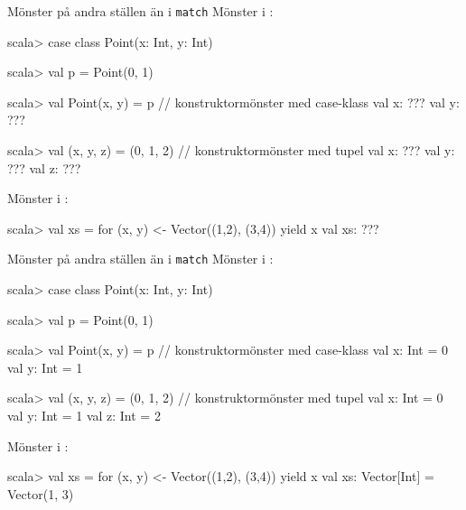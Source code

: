 \ifkompendium\else
\begin{Slide}{Mönster på andra ställen än i \texttt{match}}\SlideFontSmall
Mönster i :
\vspace{-0.25em}\begin{REPL}
scala> case class Point(x: Int, y: Int)

scala> val p = Point(0, 1)

scala> val Point(x, y) = p          // konstruktormönster med case-klass
val x: ???
val y: ???

scala> val (x, y, z) = (0, 1, 2)    // konstruktormönster med tupel
val x: ???
val y: ???
val z: ???

\end{REPL}
Mönster i :
\vspace{-0.25em}\begin{REPL}
scala> val xs = for (x, y) <- Vector((1,2), (3,4)) yield x
val xs: ???
\end{REPL}

\end{Slide}
\fi

\begin{Slide}{Mönster på andra ställen än i \texttt{match}}\SlideFontSmall
Mönster i :
\vspace{-0.25em}\begin{REPL}
scala> case class Point(x: Int, y: Int)

scala> val p = Point(0, 1)

scala> val Point(x, y) = p          // konstruktormönster med case-klass
val x: Int = 0
val y: Int = 1

scala> val (x, y, z) = (0, 1, 2)    // konstruktormönster med tupel
val x: Int = 0
val y: Int = 1
val z: Int = 2

\end{REPL}
Mönster i :
\vspace{-0.25em}\begin{REPL}
scala> val xs = for (x, y) <- Vector((1,2), (3,4)) yield x
val xs: Vector[Int] = Vector(1, 3)
\end{REPL}
\end{Slide}

